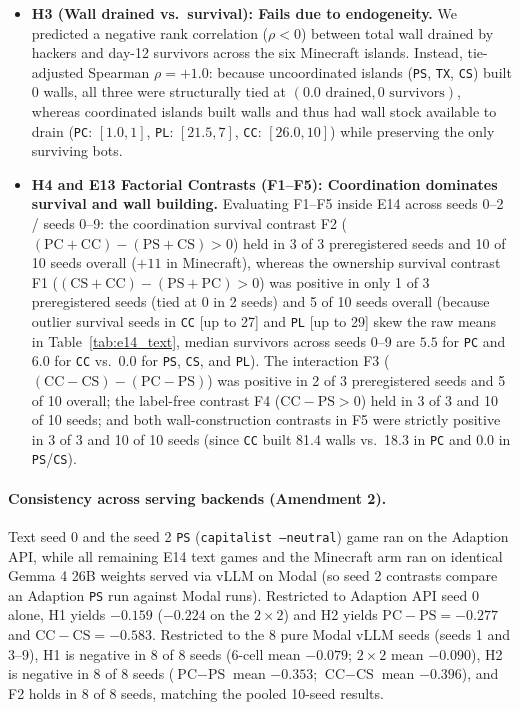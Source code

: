 \documentclass[10pt,letterpaper]{article}
\begin{document}
\begin{itemize}[leftmargin=1.5em]
  \item \textbf{H3 (Wall drained vs.\ survival): Fails due to endogeneity.} We predicted a negative rank correlation ($\rho < 0$) between total wall drained by hackers and day-12 survivors across the six Minecraft islands. Instead, tie-adjusted Spearman $\rho = +1.0$: because uncoordinated islands (\texttt{PS}, \texttt{TX}, \texttt{CS}) built 0 walls, all three were structurally tied at $(0.0\text{ drained}, 0\text{ survivors})$, whereas coordinated islands built walls and thus had wall stock available to drain (\texttt{PC}: $[1.0, 1]$, \texttt{PL}: $[21.5, 7]$, \texttt{CC}: $[26.0, 10]$) while preserving the only surviving bots.
  \item \textbf{H4 and E13 Factorial Contrasts (F1--F5): Coordination dominates survival and wall building.} Evaluating F1--F5 inside E14 across seeds 0--2 / seeds 0--9: the coordination survival contrast F2 ($(\text{PC} + \text{CC}) - (\text{PS} + \text{CS}) > 0$) held in 3 of 3 preregistered seeds and 10 of 10 seeds overall ($+11$ in Minecraft), whereas the ownership survival contrast F1 ($(\text{CS} + \text{CC}) - (\text{PS} + \text{PC}) > 0$) was positive in only 1 of 3 preregistered seeds (tied at 0 in 2 seeds) and 5 of 10 seeds overall (because outlier survival seeds in \texttt{CC} [up to 27] and \texttt{PL} [up to 29] skew the raw means in Table~\ref{tab:e14_text}, median survivors across seeds 0--9 are $5.5$ for \texttt{PC} and $6.0$ for \texttt{CC} vs.\ $0.0$ for \texttt{PS}, \texttt{CS}, and \texttt{PL}). The interaction F3 ($(\text{CC} - \text{CS}) - (\text{PC} - \text{PS})$) was positive in 2 of 3 preregistered seeds and 5 of 10 overall; the label-free contrast F4 ($\text{CC} - \text{PS} > 0$) held in 3 of 3 and 10 of 10 seeds; and both wall-construction contrasts in F5 were strictly positive in 3 of 3 and 10 of 10 seeds (since \texttt{CC} built 81.4 walls vs.\ 18.3 in \texttt{PC} and 0.0 in \texttt{PS}/\texttt{CS}).
\end{itemize}

\paragraph{Consistency across serving backends (Amendment 2).}
Text seed 0 and the seed 2 \texttt{PS} (\texttt{capitalist --neutral}) game ran on the Adaption API, while all remaining E14 text games and the Minecraft arm ran on identical Gemma 4 26B weights served via vLLM on Modal (so seed 2 contrasts compare an Adaption \texttt{PS} run against Modal runs). Restricted to Adaption API seed 0 alone, H1 yields $-0.159$ ($-0.224$ on the $2 \times 2$) and H2 yields $\text{PC} - \text{PS} = -0.277$ and $\text{CC} - \text{CS} = -0.583$. Restricted to the 8 pure Modal vLLM seeds (seeds 1 and 3--9), H1 is negative in 8 of 8 seeds (6-cell mean $-0.079$; $2 \times 2$ mean $-0.090$), H2 is negative in 8 of 8 seeds ($\text{PC} - \text{PS}$ mean $-0.353$; $\text{CC} - \text{CS}$ mean $-0.396$), and F2 holds in 8 of 8 seeds, matching the pooled 10-seed results.
\end{document}

